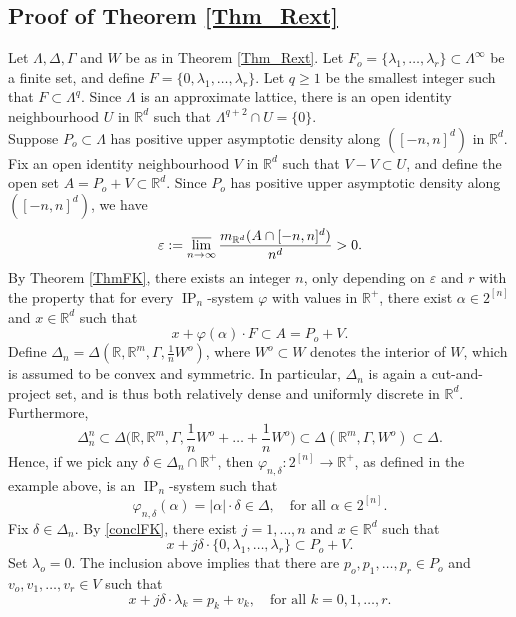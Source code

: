 \documentclass[12pt,reqno,a4paper]{amsart}
\numberwithin{equation}{section}
\newcommand{\bR}{\mathbb{R}}
\newcommand{\ra}{\rightarrow}
\newcommand{\eps}{\varepsilon}
\DeclareMathOperator{\IP}{IP}
\theoremstyle{theorem}
\theoremstyle{task}
\theoremstyle{definition}
\begin{document}
\subsection*{Proof of Theorem \ref{Thm_Rext}}

Let $\Lambda, \Delta, \Gamma$ and $W$ be as in Theorem \ref{Thm_Rext}. Let 
$F_o = \{\lambda_1,\ldots,\lambda_r\} \subset \Lambda^\infty$ be a finite set, 
and define $F = \{0,\lambda_1,\ldots,\lambda_r\}$. Let $q \geq 1$ be the smallest
integer such that $F \subset \Lambda^q$. Since $\Lambda$ is an approximate lattice,
there is an open identity neighbourhood $U$ in $\bR^d$ such that $\Lambda^{q+2} \cap U = \{0\}$. \\

Suppose $P_o \subset \Lambda$ has positive upper asymptotic density along $([-n,n]^d)$ in $\bR^d$. Fix an open identity neighbourhood $V$ in $\bR^d$ such that $V-V \subset U$, and define the open set $A = P_o + V \subset \bR^d$. 
Since $P_o$ has positive upper asymptotic density along $([-n,n]^d)$, we have
\[
\eps := \varlimsup_{n \ra \infty} \frac{m_{\bR^d}(A \cap [-n,n]^d)}{n^d} > 0.
\]
By Theorem \ref{ThmFK}, there exists an integer $n$, only depending on $\eps$ and $r$
with the property that for every $\IP_n$-system $\varphi$ with values in $\bR^{+}$, 
there exist $\alpha \in 2^{[n]}$ and $x \in \bR^d$ such that
\begin{equation}
\label{conclFK}
x + \varphi(\alpha) \cdot F \subset A = P_o + V.
\end{equation}
Define $\Delta_n = \Delta(\bR,\bR^m,\Gamma,\frac{1}{n}W^o)$, where $W^o \subset W$ denotes
the interior of $W$, which is assumed to be convex and symmetric. In particular, $\Delta_n$ is again a cut-and-project set, and is thus both relatively dense and uniformly discrete in $\bR^d$. Furthermore, 
\[
\Delta_n^n \subset \Delta\Big(\bR,\bR^m,\Gamma,\frac{1}{n}W^o + \ldots + \frac{1}{n}W^o\Big) \subset \Delta(\bR^m,\Gamma,W^o) \subset \Delta.
\]
Hence, if we pick any $\delta \in \Delta_n \cap \bR^{+}$, then 
$\varphi_{n,\delta} : 2^{[n]} \ra \bR^{+}$, as defined in the example above, is 
an $\IP_n$-system such that 
\[
\varphi_{n,\delta}(\alpha) = |\alpha| \cdot \delta \in \Delta, \quad \textrm{for all $\alpha \in 2^{[n]}$}.
\]
Fix $\delta \in \Delta_n$. By \eqref{conclFK}, 
there exist $j=1,\ldots,n$ and $x \in \bR^d$ such that
\[
x + j \delta \cdot \{0,\lambda_1,\ldots,\lambda_r\} \subset P_o + V.
\]
Set $\lambda_o = 0$. The inclusion above implies that there are $p_o,p_1,\ldots,p_r \in P_o$ and $v_o,v_1,\ldots,v_r \in V$ such that
\[
x + j\delta \cdot \lambda_k = p_k + v_k, \quad \textrm{for all $k=0,1,\ldots,r$}.
\]
\end{document}
